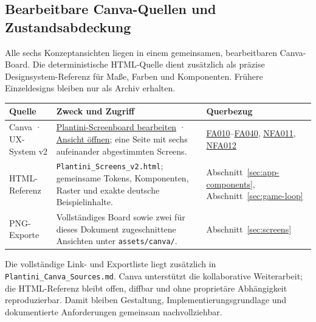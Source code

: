 \documentclass[10pt,a4paper,oneside]{article}
\newcommand{\R}[1]{\hyperlink{req:#1}{\textcolor{Forest}{#1}}}
\newcommand{\Code}[1]{\texttt{\small #1}}
\begin{document}
\begin{landscape}
\clearpage
\subsection{Bearbeitbare Canva-Quellen und Zustandsabdeckung}

Alle sechs Konzeptansichten liegen in einem gemeinsamen, bearbeitbaren Canva-Board. Die deterministische HTML-Quelle dient zusätzlich als präzise Designsystem-Referenz für Maße, Farben und Komponenten. Frühere Einzeldesigns bleiben nur als Archiv erhalten.

\begin{tabularx}{\linewidth}{@{}p{35mm}X p{42mm}@{}}
\toprule
\textbf{Quelle} & \textbf{Zweck und Zugriff} & \textbf{Querbezug} \\
\midrule
Canva · UX-System v2 & \href{https://www.canva.com/d/a176LrI0sc6nkWR}{Plantini-Screenboard bearbeiten} · \href{https://www.canva.com/d/-BRKL8MG50Gfh56}{Ansicht öffnen}; eine Seite mit sechs aufeinander abgestimmten Screens. & \R{FA010}--\R{FA040}, \R{NFA011}, \R{NFA012} \\
HTML-Referenz & \Code{Plantini\_Screens\_v2.html}; gemeinsame Tokens, Komponenten, Raster und exakte deutsche Beispielinhalte. & Abschnitt~\ref{sec:app-components}, Abschnitt~\ref{sec:game-loop} \\
PNG-Exporte & Vollständiges Board sowie zwei für dieses Dokument zugeschnittene Ansichten unter \Code{assets/canva/}. & Abschnitt~\ref{sec:screens} \\
\bottomrule
\end{tabularx}

\begin{decisionbox}[title={\textbf{Beigefügte UX-Sourcen}}]
Die vollständige Link- und Exportliste liegt zusätzlich in \Code{Plantini\_Canva\_Sources.md}. Canva unterstützt die kollaborative Weiterarbeit; die HTML-Referenz bleibt offen, diffbar und ohne proprietäre Abhängigkeit reproduzierbar. Damit bleiben Gestaltung, Implementierungsgrundlage und dokumentierte Anforderungen gemeinsam nachvollziehbar.
\end{decisionbox}


\end{landscape}
\end{document}
